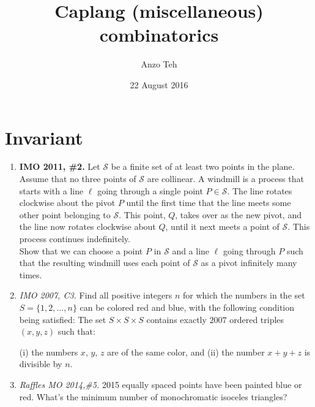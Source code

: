 \documentclass[11pt,a4paper]{article}
\begin{document}
\title{Caplang (miscellaneous) combinatorics}
\author{Anzo Teh}
\date{22 August 2016}
\maketitle

\section{Invariant}
\begin{enumerate}
\item\textbf{IMO 2011, \#2.} Let $\mathcal{S}$ be a finite set of at least two points in the plane. Assume that no three points of $\mathcal S$ are collinear. A windmill is a process that starts with a line $\ell$ going through a single point $P \in \mathcal S$. The line rotates clockwise about the pivot $P$ until the first time that the line meets some other point belonging to $\mathcal S$. This point, $Q$, takes over as the new pivot, and the line now rotates clockwise about $Q$, until it next meets a point of $\mathcal S$. This process continues indefinitely.\\
Show that we can choose a point $P$ in $\mathcal S$ and a line $\ell$ going through $P$ such that the resulting windmill uses each point of $\mathcal S$ as a pivot infinitely many times.

\item\emph{IMO 2007, C3.} Find all positive integers $ n$ for which the numbers in the set $ S = \{1,2, \ldots,n \}$ can be colored red and blue, with the following condition being satisfied: The set $ S \times S \times S$ contains exactly $ 2007$ ordered triples $ \left(x, y, z\right)$ such that:

(i) the numbers $ x$, $ y$, $ z$ are of the same color,
and
(ii) the number $ x + y + z$ is divisible by $ n$.

\item\emph {Raffles MO 2014,\#5.} 2015 equally spaced points have been painted blue or red. What's the minimum number of monochromatic isoceles triangles?
\end{enumerate}
\end{document}
